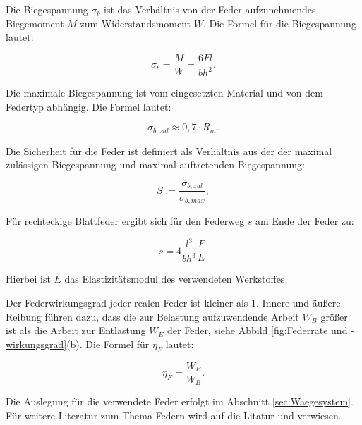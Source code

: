 Die Biegespannung $\sigma_b$ ist das Verhältnis von der Feder aufzunehmendes Biegemoment $M$ zum Widerstandsmoment $W$. Die Formel für die Biegespannung lautet:

\begin{equation}
\sigma_b = \frac{M}{W}= \frac{6 F l}{b h^2}.
\label{eq:Biegespannung}
\end{equation}

Die maximale Biegespannung ist vom eingesetzten Material und von dem Federtyp abhängig. Die Formel lautet:

\begin{equation}
\sigma_{b,zul} \approx 0,7 \cdot R_m .
\label{eq:Biegespannung}
\end{equation}

Die Sicherheit für die Feder ist definiert als Verhältnis aus der  der maximal zulässigen Biegespannung und maximal auftretenden Biegespannung:

\begin{equation}
S:= \frac{\sigma_{b,zul}}{\sigma_{b,max}};
\label{eq:Biegespannung}
\end{equation}

Für rechteckige Blattfeder ergibt sich für den Federweg $s$ am Ende der Feder zu: 

\begin{equation}
s = 4 \frac{l^3}{b h^3} \frac{F}{E}.
\label{eq:Federweg}
\end{equation}

Hierbei ist $E$ das Elastizitätsmodul des verwendeten Werkstoffes. 

Der Federwirkungsgrad jeder realen Feder ist kleiner als 1. Innere und äußere Reibung führen dazu, dass die zur Belastung aufzuwendende Arbeit $W_B$ größer ist als die Arbeit zur Entlastung $W_E$ der Feder, siehe Abbild \ref{fig:Federrate und -wirkungsgrad}(b). Die Formel für $\eta_F$ lautet:

\begin{equation}
\eta_F = \frac{W_E}{W_B}.
\label{eq:}
\end{equation}

Die Auslegung für die verwendete Feder erfolgt im Abschnitt \ref{sec:Waegesystem}. Für weitere Literatur zum Thema Federn wird auf die Litatur \citep{Wittel2011} und \citep{Ettemeyer2007} verwiesen. 
